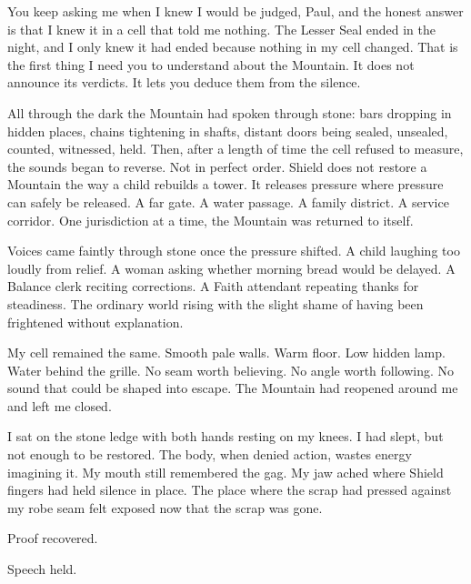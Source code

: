 
\noindent You keep asking me when I knew I would be judged, Paul, and the honest answer is that I knew it in a cell that told me nothing. The Lesser Seal ended in the night, and I only knew it had ended because nothing in my cell changed. That is the first thing I need you to understand about the Mountain. It does not announce its verdicts. It lets you deduce them from the silence.\par

\ornament

All through the dark the Mountain had spoken through stone: bars dropping in hidden places, chains tightening in shafts, distant doors being sealed, unsealed, counted, witnessed, held. Then, after a length of time the cell refused to measure, the sounds began to reverse. Not in perfect order. Shield does not restore a Mountain the way a child rebuilds a tower. It releases pressure where pressure can safely be released. A far gate. A water passage. A family district. A service corridor. One jurisdiction at a time, the Mountain was returned to itself.\par

Voices came faintly through stone once the pressure shifted. A child laughing too loudly from relief. A woman asking whether morning bread would be delayed. A Balance clerk reciting corrections. A Faith attendant repeating thanks for steadiness. The ordinary world rising with the slight shame of having been frightened without explanation.\par

My cell remained the same. Smooth pale walls. Warm floor. Low hidden lamp. Water behind the grille. No seam worth believing. No angle worth following. No sound that could be shaped into escape. The Mountain had reopened around me and left me closed.\par

I sat on the stone ledge with both hands resting on my knees. I had slept, but not enough to be restored. The body, when denied action, wastes energy imagining it. My mouth still remembered the gag. My jaw ached where Shield fingers had held silence in place. The place where the scrap had pressed against my robe seam felt exposed now that the scrap was gone.\par

Proof recovered.\par

Speech held.\par

